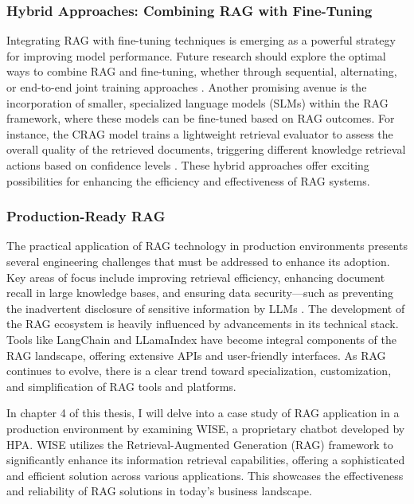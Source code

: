 \subsubsection{Hybrid Approaches: Combining RAG with Fine-Tuning}

Integrating RAG with fine-tuning techniques is emerging as a powerful strategy for improving model performance. Future research should explore the optimal ways to combine RAG and fine-tuning, whether through sequential, alternating, or end-to-end joint training approaches \cite{lin2023ra}. Another promising avenue is the incorporation of smaller, specialized language models (SLMs) within the RAG framework, where these models can be fine-tuned based on RAG outcomes. For instance, the CRAG model trains a lightweight retrieval evaluator to assess the overall quality of the retrieved documents, triggering different knowledge retrieval actions based on confidence levels \cite{yan2024corrective}. These hybrid approaches offer exciting possibilities for enhancing the efficiency and effectiveness of RAG systems.

\subsubsection{Production-Ready RAG}

The practical application of RAG technology in production environments presents several engineering challenges that must be addressed to enhance its adoption. Key areas of focus include improving retrieval efficiency, enhancing document recall in large knowledge bases, and ensuring data security—such as preventing the inadvertent disclosure of sensitive information by LLMs \cite{alon2022neuro}. The development of the RAG ecosystem is heavily influenced by advancements in its technical stack. Tools like LangChain and LLamaIndex have become integral components of the RAG landscape, offering extensive APIs and user-friendly interfaces. As RAG continues to evolve, there is a clear trend toward specialization, customization, and simplification of RAG tools and platforms.

In chapter 4 of this thesis, I will delve into a case study of RAG application in a production environment by examining WISE, a proprietary chatbot developed by HPA. WISE utilizes the Retrieval-Augmented Generation (RAG) framework to significantly enhance its information retrieval capabilities, offering a sophisticated and efficient solution across various applications. This showcases the effectiveness and reliability of RAG solutions in today’s business landscape.

